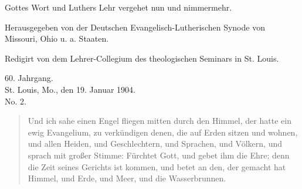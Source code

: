 \begin{titelseite}

Gottes Wort und Luthers Lehr vergehet nun und nimmermehr.


Herausgegeben von der Deutschen Evangelisch-Lutherischen Synode von Missouri, Ohio u. a. Staaten.

Redigirt von dem Lehrer-Collegium des theologischen Seminars in St. Louis.

60. Jahrgang.\\
St. Louis, Mo., den 19. Januar 1904.\\
No. 2.

\begin{quote}
Und ich sahe einen Engel fliegen mitten durch den Himmel, der hatte ein ewig Evangelium, zu verkündigen denen, die auf Erden sitzen und wohnen, und allen Heiden, und Geschlechtern, und Sprachen, und Völkern, und sprach mit großer Stimme: Fürchtet Gott, und gebet ihm die Ehre; denn die Zeit seines Gerichts ist kommen, und betet an den, der gemacht hat Himmel, und Erde, und Meer, und die Wasserbrunnen.
\end{quote}
\end{titelseite}
